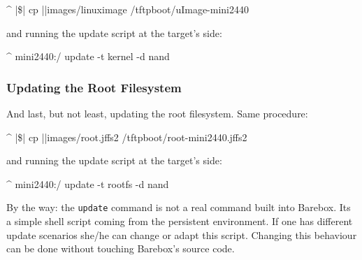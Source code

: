 \begin{ptxshell}[escapechar=|]{^}
|\$| cp |\ptxdistPlatformDir |images/linuximage /tftpboot/uImage-mini2440
\end{ptxshell}

and running the update script at the target's side:

\begin{ptxshell}[escapechar=|]{^}
mini2440:/ update -t kernel -d nand
\end{ptxshell}

\subsubsection{Updating the Root Filesystem}

And last, but not least, updating the root filesystem. Same procedure:

\begin{ptxshell}[escapechar=|]{^}
|\$| cp |\ptxdistPlatformDir |images/root.jffs2 /tftpboot/root-mini2440.jffs2
\end{ptxshell}

and running the update script at the target's side:

\begin{ptxshell}[escapechar=|]{^}
mini2440:/ update -t rootfs -d nand
\end{ptxshell}

By the way: the \texttt{update} command is not a real command built into
Barebox. Its a simple shell script coming from the persistent environment.
If one has different update scenarios she/he can change or adapt this script.
Changing this behaviour can be done without touching Barebox's source code.

%
